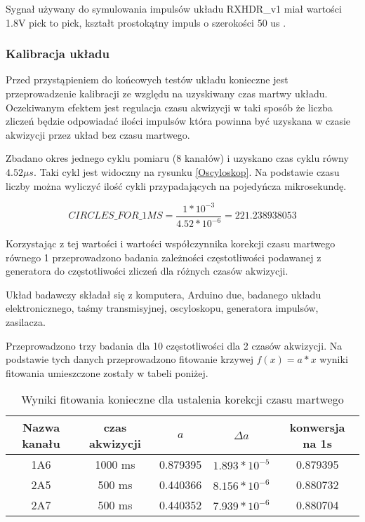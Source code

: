 Sygnał używany do symulowania impulsów układu RXHDR\_v1 miał wartości 1.8V pick to pick, kształt prostokątny impuls o szerokości 50 us .


\subsubsection{Kalibracja układu}
\label{section kaliblracja}

Przed przystąpieniem do końcowych testów układu konieczne jest przeprowadzenie kalibracji ze względu na uzyskiwany czas martwy układu. 
Oczekiwanym efektem jest regulacja czasu akwizycji w taki sposób że liczba zliczeń będzie odpowiadać ilości impulsów która powinna być uzyskana w czasie akwizycji przez układ bez czasu martwego. 

Zbadano okres jednego cyklu pomiaru (8 kanałów) i uzyskano czas cyklu równy $4.52 \mu s$. Taki cykl jest widoczny na rysunku \ref{Oscyloskop}.
Na podstawie czasu liczby można wyliczyć ilość cykli przypadających na pojedyńcza mikrosekundę.

\begin{equation}
        \label{per cykl}
        CIRCLES\_FOR\_1MS = \frac{1*10^{-3}}{4.52 * 10^{-6}} = 221.238938053
\end{equation}

Korzystając z tej wartości i wartości współczynnika korekcji czasu martwego równego 1 przeprowadzono badania zależności częstotliwości podawanej z generatora do częstotliwości zliczeń dla różnych czasów akwizycji.  

Układ badawczy składał się z komputera, Arduino due, badanego układu elektronicznego, taśmy transmisyjnej, oscyloskopu, generatora impulsów, zasilacza. 

Przeprowadzono trzy badania dla 10 częstotliwości dla 2 czasów akwizycji. Na podstawie tych danych przeprowadzono fitowanie krzywej $f(x) = a*x$ wyniki fitowania umieszczone zostały w tabeli poniżej.

\begin{table}
        \caption{Wyniki fitowania konieczne dla ustalenia korekcji czasu martwego}
        \label{dead time fit}
        \centering
        \begin{tabular}{|c|c|c|c|c|}
                \hline
                Nazwa kanału & czas akwizycji & $a$ & $\Delta a$ & konwersja na 1s \\ \hline
                1A6 & 1000 ms & 0.879395 & $1.893 * 10^{-5}$ & 0.879395 \\ \hline
                2A5 & 500 ms & 0.440366 & $8.156 * 10^{-6}$ & 0.880732 \\ \hline
                2A7 & 500 ms & 0.440352 & $7.939 * 10^{-6}$ & 0.880704 \\ \hline
        \end{tabular}
\end{table}

